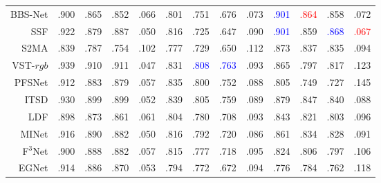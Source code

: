 \begin{table}[]
{\begin{tabular}{rcccccccccccc}
			
			BBS-Net     \cite{fan2020bbs} 
			& .900 & .865 & .852 & .066 
			& .801 & .751 & .676 & .073 
			& \textcolor{blue}{.901} & {\textcolor{red}{.864}} & .858 & .072 \\ 
			
			SSF     \cite{zhang2020select} 
			& .922 & .879 & .887 & .050 
			& .816 & .725 & .647 & .090 
			& \textcolor{blue}{.901} & .859 & \textcolor{blue}{.868} & {\textcolor{red}{.067}} \\ 
			
			S2MA    \cite{liu2020learning} 
			& .839 & .787 & .754 & 	.102 
			& .777 & .729 & .650 & .112 
			& .873 & .837 &	.835 & .094 \\
			
			
			\midrule %
			
			VST-$rgb$ \cite{liu2021visual} 
			& .939 & .910 & .911 & .047
			& .831 & \textcolor{blue}{.808} & \textcolor{blue}{.763} & .093 
			& .865 & .797 & .817 & .123 
			\\ 
			
			PFSNet \cite{ma2021pyramidal}
			& .912 & .883 & .879 & .057 
			& .835 & .800 & .752 & .088 
			& .805 & .749 & .727 & .145 
			\\ 
			
			
			ITSD \cite{zhou2020interactive} 
			& .930 & .899 & .899 & .052 
			& .839 & .805 & .759 & .089 
			& .879 & .847 & .840 & .088 
			\\ 
			
			
			
			LDF \cite{wei2020label} 
			& .898 & .873 & .861 & .061 
			& .804 & .780 & .708 & .093 
			& .843 & .821 & .803 & .096 
			\\ 
			
			
			MINet \cite{pang2020multi} 
			& .916 & .890 & .882 & .050 
			& .816 & .792 & .720 & .086 
			& .861 & .834 & .828 & .091 
			\\ 
			
			F$^{3}$Net  \cite{wei2020f3net}
			& .900 & .888 & .882 & .057 
			& .815 & .777 & .718 & .095 
			& .824 & .806 & .797 & .106 
			\\ 
			
			
			EGNet   \cite{zhao2019egnet}
			& .914 & .886 & .870 & .053 
			& .794 & .772 & .672 & .094 
			& .776 & .784 & .762 & .118 
			\\ 
			

\end{tabular}}
\end{table}
